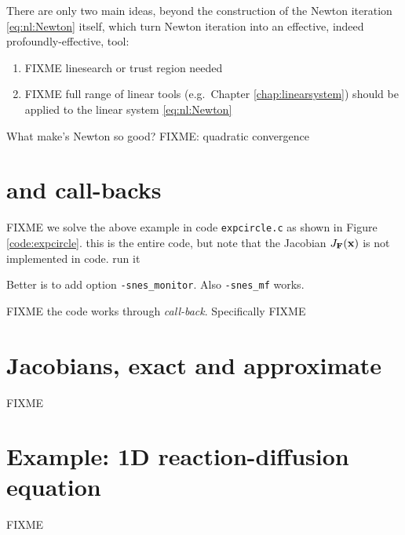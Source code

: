 \medskip
There are only two main ideas, beyond the construction of the Newton iteration \eqref{eq:nl:Newton} itself, which turn Newton iteration into an effective, indeed profoundly-effective, tool:
\renewcommand{\labelenumi}{\roman{enumi})}
\begin{enumerate}
\item FIXME linesearch or trust region needed \citep{Kelley2003}
\item FIXME full range of linear tools (e.g.~Chapter \ref{chap:linearsystem}) should be applied to the linear system \eqref{eq:nl:Newton}
\end{enumerate}

What make's Newton so good?  FIXME: quadratic convergence


\section{\pSNES and call-backs}

FIXME  we solve the above example in code \texttt{expcircle.c} as shown in Figure \ref{code:expcircle}.  this is the entire code, but note that the Jacobian $J_{\mathbf{F}}(\mathbf{x})$ is not implemented in code.  run it
Better is to add option \texttt{-snes\_monitor}.  Also \texttt{-snes\_mf} works.

FIXME the code works through \emph{call-back}.  Specifically FIXME

\vfill
{}


\section{Jacobians, exact and approximate}

FIXME

\vfill
{}



\section{Example: 1D reaction-diffusion equation}

FIXME

\vfill
{}

